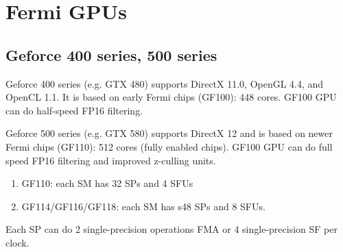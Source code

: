 



\section{Fermi GPUs}

\subsection{Geforce 400 series, 500 series}
\label{sec:Fermi-based-Geforce}

Geforce 400 series (e.g. GTX 480) supports DirectX 11.0, OpenGL 4.4, and OpenCL
1.1. It is based on early Fermi chips (GF100): 448 cores. GF100 GPU can do
half-speed FP16 filtering.

Geforce 500 series (e.g. GTX 580) supports DirectX 12 and is based on newer
Fermi chips (GF110): 512 cores (fully enabled chips). GF100 GPU can do full
speed FP16 filtering and improved z-culling units.
\begin{enumerate}
  \item GF110: each SM has 32 SPs and 4 SFUs
  \item GF114/GF116/GF118: each SM has s48 SPs and 8 SFUs.
\end{enumerate}
Each SP can do 2 single-precision operations FMA or 4 single-precision SF per
clock. 
